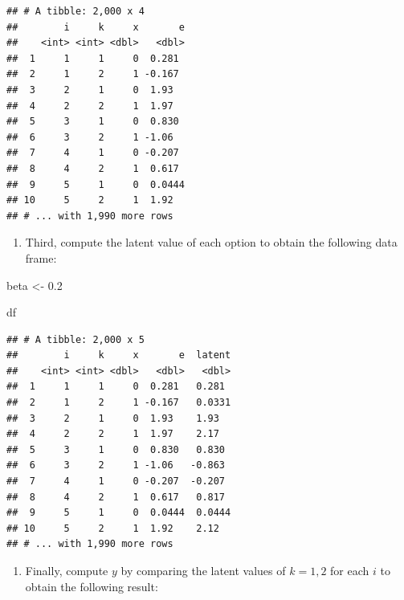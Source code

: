 \documentclass[
]{book}
\newenvironment{Shaded}{\begin{snugshade}}{\end{snugshade}}
\newcommand{\FloatTok}[1]{\textcolor[rgb]{0.00,0.00,0.81}{#1}}
\newcommand{\NormalTok}[1]{#1}
\newcommand{\OtherTok}[1]{\textcolor[rgb]{0.56,0.35,0.01}{#1}}
\providecommand{\tightlist}{%
  \setlength{\itemsep}{0pt}\setlength{\parskip}{0pt}}
\begin{document}
\begin{verbatim}
## # A tibble: 2,000 x 4
##        i     k     x       e
##    <int> <int> <dbl>   <dbl>
##  1     1     1     0  0.281 
##  2     1     2     1 -0.167 
##  3     2     1     0  1.93  
##  4     2     2     1  1.97  
##  5     3     1     0  0.830 
##  6     3     2     1 -1.06  
##  7     4     1     0 -0.207 
##  8     4     2     1  0.617 
##  9     5     1     0  0.0444
## 10     5     2     1  1.92  
## # ... with 1,990 more rows
\end{verbatim}

\begin{enumerate}
\def\labelenumi{\arabic{enumi}.}
\setcounter{enumi}{2}
\tightlist
\item
  Third, compute the latent value of each option to obtain the following data frame:
\end{enumerate}

\begin{Shaded}
\begin{Highlighting}[]
\NormalTok{beta }\OtherTok{\textless{}{-}} \FloatTok{0.2}
\end{Highlighting}
\end{Shaded}

\begin{Shaded}
\begin{Highlighting}[]
\NormalTok{df}
\end{Highlighting}
\end{Shaded}

\begin{verbatim}
## # A tibble: 2,000 x 5
##        i     k     x       e  latent
##    <int> <int> <dbl>   <dbl>   <dbl>
##  1     1     1     0  0.281   0.281 
##  2     1     2     1 -0.167   0.0331
##  3     2     1     0  1.93    1.93  
##  4     2     2     1  1.97    2.17  
##  5     3     1     0  0.830   0.830 
##  6     3     2     1 -1.06   -0.863 
##  7     4     1     0 -0.207  -0.207 
##  8     4     2     1  0.617   0.817 
##  9     5     1     0  0.0444  0.0444
## 10     5     2     1  1.92    2.12  
## # ... with 1,990 more rows
\end{verbatim}

\begin{enumerate}
\def\labelenumi{\arabic{enumi}.}
\setcounter{enumi}{3}
\tightlist
\item
  Finally, compute \(y\) by comparing the latent values of \(k = 1, 2\) for each \(i\) to obtain the following result:
\end{enumerate}
\end{document}
